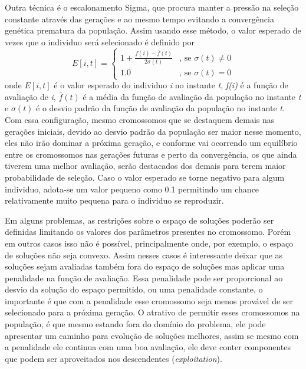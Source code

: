 Outra técnica é o escalonamento Sigma, que procura manter a pressão na seleção constante através das gerações e ao mesmo tempo evitando a convergência genética prematura da população. Assim usando esse método, o valor esperado de vezes que o individuo será selecionado é definido por 
\begin{equation*}
E[i,t] = \left \lbrace  \begin{array}{cc} 1 + \frac{f(i) - \overline{f}(t)}{2\sigma(t)} & \text{, se } \sigma(t) \neq 0 \\
					1.0 & \text{, se } \sigma(t) = 0  \end{array}  \right.
\end{equation*}
onde \(E[i,t]\) é o valor esperado do individuo \textit{i} no instante \textit{t}, \textit{f(i)} é a função de avaliação de \textit{i}, \(\overline{f}(t)\) é a média da função de avaliação da população no instante \textit{t} e \(\sigma(t)\) é o desvio padrão da função de avaliação da população no instante \textit{t}. Com essa configuração, mesmo cromossomos que se destaquem demais nas gerações iniciais, devido ao desvio padrão da população ser maior nesse momento, eles não irão dominar a próxima geração, e conforme vai ocorrendo um equilíbrio entre os cromossomos nas gerações futuras e perto da convergência, os que ainda tiverem uma melhor avaliação, serão destacados dos demais para terem maior probabilidade de seleção. Caso o valor esperado se torne negativo para algum individuo, adota-se um valor pequeno como 0.1 permitindo um chance relativamente muito pequena para o individuo se reproduzir. \cite{Mitchell1996}

Em alguns problemas, as restrições sobre o espaço de soluções poderão ser definidas limitando os valores dos parâmetros presentes no cromossomo. Porém em outros casos isso não é possível, principalmente onde, por exemplo, o espaço de soluções não seja convexo. Assim nesses casos é interessante deixar que as soluções sejam avaliadas também fora do espaço de soluções mas aplicar uma penalidade na função de avaliação. Essa penalidade pode ser proporcional ao desvio da solução do espaço permitido, ou uma penalidade constante, o importante é que com a penalidade esse cromossomo seja menos provável de ser selecionado para a próxima geração. O atrativo de permitir esses cromossomos na população, é que mesmo estando fora do domínio do problema, ele pode apresentar um caminho para evolução de soluções melhores, assim se mesmo com a penalidade ele continua com uma boa avaliação, ele deve conter componentes que podem ser aproveitados nos descendentes (\textit{exploitation}).

